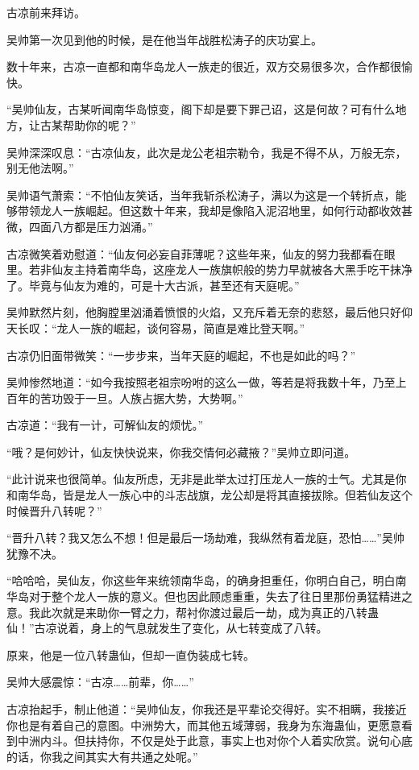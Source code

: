 \begin{this_body}
古凉前来拜访。

吴帅第一次见到他的时候，是在他当年战胜松涛子的庆功宴上。

数十年来，古凉一直都和南华岛龙人一族走的很近，双方交易很多次，合作都很愉快。

“吴帅仙友，古某听闻南华岛惊变，阁下却是要下罪己诏，这是何故？可有什么地方，让古某帮助你的呢？”

吴帅深深叹息：“古凉仙友，此次是龙公老祖宗勒令，我是不得不从，万般无奈，别无他法啊。”

吴帅语气萧索：“不怕仙友笑话，当年我斩杀松涛子，满以为这是一个转折点，能够带领龙人一族崛起。但这数十年来，我却是像陷入泥沼地里，如何行动都收效甚微，四面八方都是压力汹涌。”

古凉微笑着劝慰道：“仙友何必妄自菲薄呢？这些年来，仙友的努力我都看在眼里。若非仙友主持着南华岛，这座龙人一族旗帜般的势力早就被各大黑手吃干抹净了。毕竟与仙友为难的，可是十大古派，甚至还有天庭呢。”

吴帅默然片刻，他胸膛里汹涌着愤恨的火焰，又充斥着无奈的悲怒，最后他只好仰天长叹：“龙人一族的崛起，谈何容易，简直是难比登天啊。”

古凉仍旧面带微笑：“一步步来，当年天庭的崛起，不也是如此的吗？”

吴帅惨然地道：“如今我按照老祖宗吩咐的这么一做，等若是将我数十年，乃至上百年的苦功毁于一旦。人族占据大势，大势啊。”

古凉道：“我有一计，可解仙友的烦忧。”

“哦？是何妙计，仙友快快说来，你我交情何必藏掖？”吴帅立即问道。

“此计说来也很简单。仙友所虑，无非是此举太过打压龙人一族的士气。尤其是你和南华岛，皆是龙人一族心中的斗志战旗，龙公却是将其直接拔除。但若仙友这个时候晋升八转呢？”

“晋升八转？我又怎么不想！但是最后一场劫难，我纵然有着龙庭，恐怕……”吴帅犹豫不决。

“哈哈哈，吴仙友，你这些年来统领南华岛，的确身担重任，你明白自己，明白南华岛对于整个龙人一族的意义。但也因此顾虑重重，失去了往日里那份勇猛精进之意。我此次就是来助你一臂之力，帮衬你渡过最后一劫，成为真正的八转蛊仙！”古凉说着，身上的气息就发生了变化，从七转变成了八转。

原来，他是一位八转蛊仙，但却一直伪装成七转。

吴帅大感震惊：“古凉……前辈，你……”

古凉抬起手，制止他道：“吴帅仙友，你我还是平辈论交得好。实不相瞒，我接近你也是有着自己的意图。中洲势大，而其他五域薄弱，我身为东海蛊仙，更愿意看到中洲内斗。但扶持你，不仅是处于此意，事实上也对你个人着实欣赏。说句心底的话，你我之间其实大有共通之处呢。”


\end{this_body}
